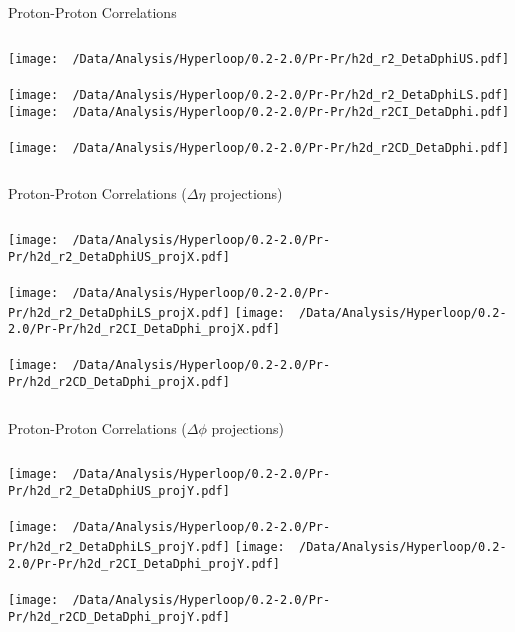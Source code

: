 \documentclass{beamer}
\begin{document}
\begin{frame}{Proton-Proton Correlations}
	\begin{columns}
		\centering
		\texttt{[image: ~/Data/Analysis/Hyperloop/0.2-2.0/Pr-Pr/h2d\_r2\_DetaDphiUS.pdf]}\\~\\
		\texttt{[image: ~/Data/Analysis/Hyperloop/0.2-2.0/Pr-Pr/h2d\_r2\_DetaDphiLS.pdf]}
		\centering
		\texttt{[image: ~/Data/Analysis/Hyperloop/0.2-2.0/Pr-Pr/h2d\_r2CI\_DetaDphi.pdf]}\\~\\
		\texttt{[image: ~/Data/Analysis/Hyperloop/0.2-2.0/Pr-Pr/h2d\_r2CD\_DetaDphi.pdf]}
	\end{columns}
\end{frame}
\begin{frame}{Proton-Proton Correlations ($\Delta\eta$ projections)}
	\begin{columns}
		\column{0.5\linewidth}
		\centering
		\texttt{[image: ~/Data/Analysis/Hyperloop/0.2-2.0/Pr-Pr/h2d\_r2\_DetaDphiUS\_projX.pdf]}\\~\\
		\texttt{[image: ~/Data/Analysis/Hyperloop/0.2-2.0/Pr-Pr/h2d\_r2\_DetaDphiLS\_projX.pdf]}
		\column{0.5\linewidth}
		\centering
		\texttt{[image: ~/Data/Analysis/Hyperloop/0.2-2.0/Pr-Pr/h2d\_r2CI\_DetaDphi\_projX.pdf]}\\~\\
		\texttt{[image: ~/Data/Analysis/Hyperloop/0.2-2.0/Pr-Pr/h2d\_r2CD\_DetaDphi\_projX.pdf]}
	\end{columns}
\end{frame}
\begin{frame}{Proton-Proton Correlations ($\Delta\phi$ projections)}
	\begin{columns}
		\centering
		\texttt{[image: ~/Data/Analysis/Hyperloop/0.2-2.0/Pr-Pr/h2d\_r2\_DetaDphiUS\_projY.pdf]}\\~\\
		\texttt{[image: ~/Data/Analysis/Hyperloop/0.2-2.0/Pr-Pr/h2d\_r2\_DetaDphiLS\_projY.pdf]}
		\centering
		\texttt{[image: ~/Data/Analysis/Hyperloop/0.2-2.0/Pr-Pr/h2d\_r2CI\_DetaDphi\_projY.pdf]}\\~\\
		\texttt{[image: ~/Data/Analysis/Hyperloop/0.2-2.0/Pr-Pr/h2d\_r2CD\_DetaDphi\_projY.pdf]}
	\end{columns}
\end{frame}
\end{document}
